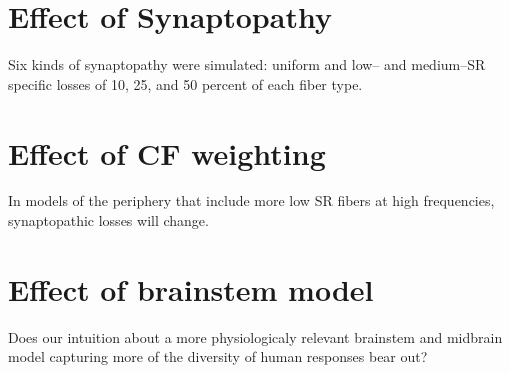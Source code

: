 \section{Effect of Synaptopathy} %
\label{sec:effect_of_synaptopathy}
Six kinds of synaptopathy were simulated: uniform and low-- and medium--SR specific losses of 10, 25, and 50 percent of each fiber type. 

\section{Effect of CF weighting} %
\label{sec:effect_of_cf_weighting}
In models of the periphery that include more low SR fibers at high frequencies, synaptopathic losses will change.

\section{Effect of brainstem model} %
\label{sec:effect_of_brainstem_model}
Does our intuition about a more physiologicaly relevant brainstem and midbrain model capturing more of the diversity of human responses bear out? 
